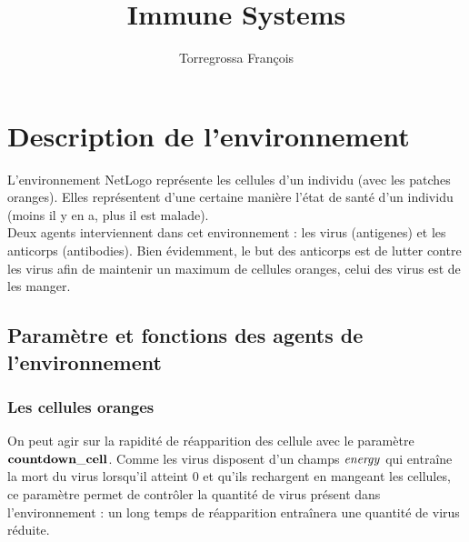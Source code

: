 \documentclass[11pt]{article} %
\title{Immune Systems}
\author{Torregrossa François}
\numberwithin{equation}{section} %
\begin{document}
\maketitle

\section{Description de l'environnement}

L'environnement NetLogo représente les cellules d'un individu (avec les patches oranges). Elles représentent d'une certaine manière l'état de santé d'un individu (moins il y en a, plus il est malade).
\\
Deux agents interviennent dans cet environnement : les virus (antigenes) et les anticorps (antibodies). Bien évidemment, le but des anticorps est de lutter contre les virus afin de maintenir un maximum de cellules oranges, celui des virus est de les manger.

\subsection{Paramètre et fonctions des agents de l'environnement}
\subsubsection{Les cellules oranges}
On peut agir sur la rapidité de réapparition des cellule avec le paramètre $\bf{countdown\_cell}$. Comme les virus disposent d'un champs $\it{energy}$ qui entraîne la mort du virus lorsqu'il atteint 0 et qu'ils rechargent en mangeant les cellules, ce paramètre permet de contrôler la quantité de virus présent dans l'environnement : un long temps de réapparition entraînera une quantité de virus réduite.
\end{document}
